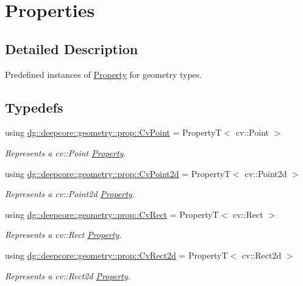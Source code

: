 \hypertarget{group___geometry_properties}{}\section{Properties}
\label{group___geometry_properties}


\subsection{Detailed Description}
Predefined instances of \hyperlink{classdg_1_1deepcore_1_1_property}{Property} for geometry types. 

\subsection*{Typedefs}
\begin{DoxyCompactItemize}
\item 
using \hyperlink{group___geometry_properties_gab53d82d9179777c4980eac502530a8c6}{dg\+::deepcore\+::geometry\+::prop\+::\+Cv\+Point} = PropertyT$<$ cv\+::\+Point $>$
\begin{DoxyCompactList}\small\item\em Represents a {\ttfamily cv\+::\+Point} \hyperlink{classdg_1_1deepcore_1_1_property}{Property}. \end{DoxyCompactList}\item 
using \hyperlink{group___geometry_properties_ga4125b4549e9900f3592c85733b223966}{dg\+::deepcore\+::geometry\+::prop\+::\+Cv\+Point2d} = PropertyT$<$ cv\+::\+Point2d $>$
\begin{DoxyCompactList}\small\item\em Represents a {\ttfamily cv\+::\+Point2d} \hyperlink{classdg_1_1deepcore_1_1_property}{Property}. \end{DoxyCompactList}\item 
using \hyperlink{group___geometry_properties_ga650cb626fb0e3ea63706df17b8e0e59d}{dg\+::deepcore\+::geometry\+::prop\+::\+Cv\+Rect} = PropertyT$<$ cv\+::\+Rect $>$
\begin{DoxyCompactList}\small\item\em Represents a {\ttfamily cv\+::\+Rect} \hyperlink{classdg_1_1deepcore_1_1_property}{Property}. \end{DoxyCompactList}\item 
using \hyperlink{group___geometry_properties_ga7009c5f5d32fd1adfe3e034126b527cb}{dg\+::deepcore\+::geometry\+::prop\+::\+Cv\+Rect2d} = PropertyT$<$ cv\+::\+Rect2d $>$
\begin{DoxyCompactList}\small\item\em Represents a {\ttfamily cv\+::\+Rect2d} \hyperlink{classdg_1_1deepcore_1_1_property}{Property}. \end{DoxyCompactList}\item 

\end{DoxyCompactItemize}
